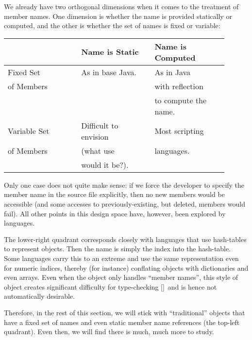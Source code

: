 
We already have two orthogonal dimensions when it comes to the treatment of member
names. One dimension is whether the name is provided statically or computed, and the
other is whether the set of names is fixed or variable:
\begin{tabular}{|p{0.3\linewidth}|p{0.3\linewidth}|p{0.3\linewidth}|}
\hline
& Name is Static & Name is Computed \\
\hline
Fixed Set & As in base Java. & As in Java \\
of Members && with reflection \\ &&to compute the name.\\
\hline
Variable Set& Difficult to envision & Most
scripting \\
of Members & (what use & languages. \\ & would it be?). &\\ 
\hline
\end{tabular}
Only one case does not quite make sense: if we force the developer to specify
the member name in the source file explicitly, then no new members would be
accessible (and some accesses to previously-existing, but deleted, members would
fail). All other points in this design space have, however, been explored by
languages.

The lower-right quadrant corresponds closely with languages that use hash-tables
to represent objects. Then the name is simply the index into the hash-table.
Some languages carry this to an extreme and use the same representation even for
numeric indices, thereby (for instance) conflating objects with dictionaries and
even arrays. Even when the object only handles “member names”, this style of
object creates significant difficulty for type-checking \ref{}\ and is hence not
automatically desirable.

Therefore, in the rest of this section, we will stick with “traditional” objects
that have a fixed set of names and even static member name references (the
top-left quadrant). Even then, we will find there is much, much more to study.
